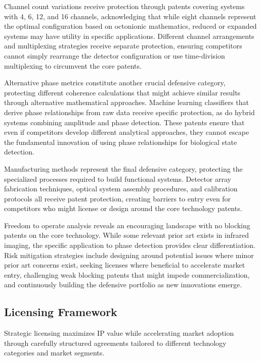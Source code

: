 \documentclass[12pt,a4paper]{report}
\begin{document}
Channel count variations receive protection through patents covering systems with 4, 6, 12, and 16 channels, acknowledging that while eight channels represent the optimal configuration based on octonionic mathematics, reduced or expanded systems may have utility in specific applications. Different channel arrangements and multiplexing strategies receive separate protection, ensuring competitors cannot simply rearrange the detector configuration or use time-division multiplexing to circumvent the core patents.

Alternative phase metrics constitute another crucial defensive category, protecting different coherence calculations that might achieve similar results through alternative mathematical approaches. Machine learning classifiers that derive phase relationships from raw data receive specific protection, as do hybrid systems combining amplitude and phase detection. These patents ensure that even if competitors develop different analytical approaches, they cannot escape the fundamental innovation of using phase relationships for biological state detection.

Manufacturing methods represent the final defensive category, protecting the specialized processes required to build functional systems. Detector array fabrication techniques, optical system assembly procedures, and calibration protocols all receive patent protection, creating barriers to entry even for competitors who might license or design around the core technology patents.

Freedom to operate analysis reveals an encouraging landscape with no blocking patents on the core technology. While some relevant prior art exists in infrared imaging, the specific application to phase detection provides clear differentiation. Risk mitigation strategies include designing around potential issues where minor prior art concerns exist, seeking licenses where beneficial to accelerate market entry, challenging weak blocking patents that might impede commercialization, and continuously building the defensive portfolio as new innovations emerge.

\subsection{Licensing Framework}

Strategic licensing maximizes IP value while accelerating market adoption through carefully structured agreements tailored to different technology categories and market segments.
\end{document}
